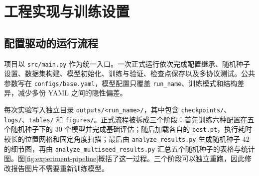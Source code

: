 \section{工程实现与训练设置}

\subsection{配置驱动的运行流程}

项目以 \texttt{src/main.py} 作为统一入口。一次正式运行依次完成配置继承、随机种子设置、数据集构建、模型初始化、训练与验证、检查点保存以及多协议测试。公共参数写在 \texttt{configs/base.yaml}，模型配置只覆盖 \texttt{run\_name}、训练模式和结构差异，减少多份 YAML 之间的隐性偏差。

每次实验写入独立目录 \texttt{outputs/<run\_name>/}，其中包含 \texttt{checkpoints/}、\texttt{logs/}、\texttt{tables/} 和 \texttt{figures/}。正式流程被拆成三个阶段：首先训练六种配置在五个随机种子下的 30 个模型并完成基础评估；随后加载各自的 \texttt{best.pt}，执行耗时较长的位置网格和固定角度扫描；最后由 \texttt{analyze\_results.py} 生成随机种子 42 的细节图，再由 \texttt{analyze\_multiseed\_results.py} 汇总五个随机种子的表格与统计图。图\ref{fig:experiment-pipeline}概括了这一过程。三个阶段可以独立重跑，因此修改报告图片不需要重新训练模型。

